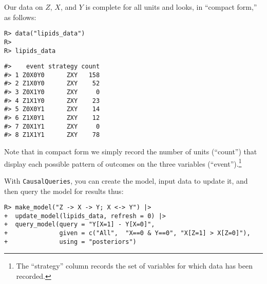 \documentclass[
  11pt,
  article]{jss}
\begin{document}
Our data on \(Z\), \(X\), and \(Y\) is complete for all units and looks,
in ``compact form,'' as follows:

\begin{verbatim}
R> data("lipids_data")
R> 
R> lipids_data
\end{verbatim}

\begin{verbatim}
#>    event strategy count
#> 1 Z0X0Y0      ZXY   158
#> 2 Z1X0Y0      ZXY    52
#> 3 Z0X1Y0      ZXY     0
#> 4 Z1X1Y0      ZXY    23
#> 5 Z0X0Y1      ZXY    14
#> 6 Z1X0Y1      ZXY    12
#> 7 Z0X1Y1      ZXY     0
#> 8 Z1X1Y1      ZXY    78
\end{verbatim}

Note that in compact form we simply record the number of units
(``count'') that display each possible pattern of outcomes on the three
variables (``event'').\footnote{The ``strategy'' column records the set
  of variables for which data has been recorded.}

With \texttt{CausalQueries}, you can create the model, input data to
update it, and then query the model for results thus:

\begin{verbatim}
R> make_model("Z -> X -> Y; X <-> Y") |>
+  update_model(lipids_data, refresh = 0) |>
+  query_model(query = "Y[X=1] - Y[X=0]",
+              given = c("All",  "X==0 & Y==0", "X[Z=1] > X[Z=0]"),
+              using = "posteriors") 
\end{verbatim}

\hypertarget{tbl-lipids}{}
\begin{table}
\caption{\label{tbl-lipids}Replication of \citet{chickering_clinicians_1996}. }\tabularnewline

\centering
{}
\end{table}
\end{document}
